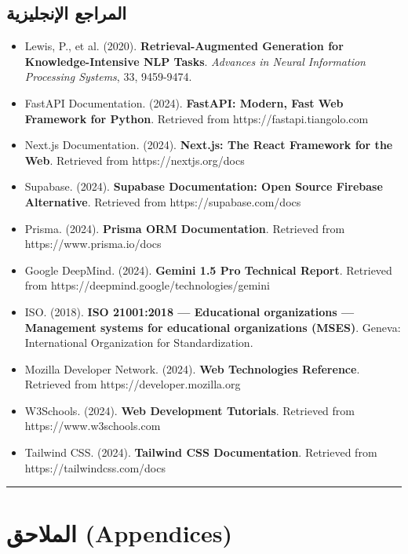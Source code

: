 \documentclass[12pt, a4paper]{report}
\begin{document}
\begin{english}
{\section*{المراجع الإنجليزية}

\begin{itemize}
\item Lewis, P., et al. (2020). \textbf{Retrieval-Augmented Generation for Knowledge-Intensive NLP Tasks}. \textit{Advances in Neural Information Processing Systems}, 33, 9459-9474.
\item FastAPI Documentation. (2024). \textbf{FastAPI: Modern, Fast Web Framework for Python}. Retrieved from https://fastapi.tiangolo.com
\item Next.js Documentation. (2024). \textbf{Next.js: The React Framework for the Web}. Retrieved from https://nextjs.org/docs
\item Supabase. (2024). \textbf{Supabase Documentation: Open Source Firebase Alternative}. Retrieved from https://supabase.com/docs
\item Prisma. (2024). \textbf{Prisma ORM Documentation}. Retrieved from https://www.prisma.io/docs
\item Google DeepMind. (2024). \textbf{Gemini 1.5 Pro Technical Report}. Retrieved from https://deepmind.google/technologies/gemini
\item ISO. (2018). \textbf{ISO 21001:2018 — Educational organizations — Management systems for educational organizations (MSES)}. Geneva: International Organization for Standardization.
\item Mozilla Developer Network. (2024). \textbf{Web Technologies Reference}. Retrieved from https://developer.mozilla.org
\item W3Schools. (2024). \textbf{Web Development Tutorials}. Retrieved from https://www.w3schools.com
\item Tailwind CSS. (2024). \textbf{Tailwind CSS Documentation}. Retrieved from https://tailwindcss.com/docs
\end{itemize}

\vspace{0.5cm}\hrule\vspace{0.5cm}

\chapter*{الملاحق (Appendices)}

}
\end{english}
\end{document}

